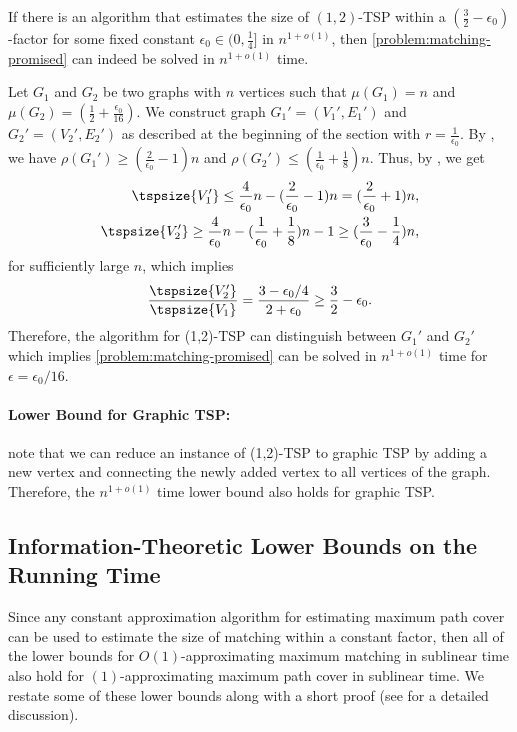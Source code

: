 \begin{theorem}\label{cor:matching-via-12tsp}
    If there is an algorithm that estimates the size of $(1,2)$-TSP within a $(\frac{3}{2} - \epsilon_0)$-factor for some fixed constant $\epsilon_0 \in (0, \frac{1}{4}]$ in $n^{1+o(1)}$, then \cref{problem:matching-promised} can indeed be solved in $n^{1+o(1)}$ time.
\end{theorem}
\begin{myproof}
Let $G_1$ and $G_2$ be two graphs with $n$ vertices such that $\mu(G_1) = n$ and $\mu(G_2) = (\frac{1}{2} + \frac{\epsilon_0}{16})$. We construct graph $G_1' = (V_1', E_1')$ and $G_2' = (V_2', E_2')$ as described at the beginning of the section with $r = \frac{1}{\epsilon_0}$. By , we have $\rho(G_1') \geq (\frac{2}{\epsilon_0} - 1)n$ and $\rho(G_2') \leq (\frac{1}{\epsilon_0}  + \frac{1}{8})n$. Thus, by , we get
\begin{align*}
    \tspsize{V_1'} \leq \frac{4}{\epsilon_0}n - (\frac{2}{\epsilon_0} - 1)n = (\frac{2}{\epsilon_0} + 1)n,\\
    \tspsize{V_2'} \geq \frac{4}{\epsilon_0}n - (\frac{1}{\epsilon_0} + \frac{1}{8})n - 1 \geq (\frac{3}{\epsilon_0} - \frac{1}{4})n,
\end{align*}
for sufficiently large $n$, which implies
\begin{align*}
    \frac{\tspsize{V_2'}}{\tspsize{V_1}} = \frac{3 - \epsilon_0/4}{2 + \epsilon_0} \geq \frac{3}{2} - \epsilon_0.
\end{align*}
Therefore, the algorithm for (1,2)-TSP can distinguish between $G_1'$ and $G_2'$ which implies \cref{problem:matching-promised} can be solved in $n^{1+o(1)}$ time for $\epsilon = \epsilon_0/16$.
\end{myproof}


\paragraph{Lower Bound for Graphic TSP:} note that we can reduce an instance of (1,2)-TSP to graphic TSP by adding a new vertex and connecting the newly added vertex to all vertices of the graph. Therefore, the $n^{1+o(1)}$ time lower bound also holds for graphic TSP.


\subsection{Information-Theoretic Lower Bounds on the Running Time}\label{sec:hardness}
Since any constant approximation algorithm for estimating maximum path cover can be used to estimate the size of matching within a constant factor, then all of the lower bounds for $O(1)$-approximating maximum matching in sublinear time also hold for $(1)$-approximating maximum path cover in sublinear time. We restate some of these lower bounds along with a short proof (see \cite{behnezhad2021} for a detailed discussion).

